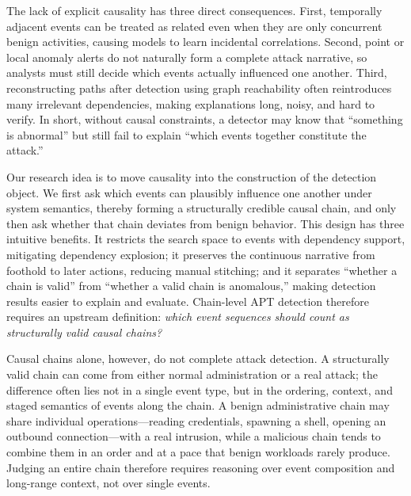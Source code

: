 The lack of explicit causality has three direct consequences. First, temporally adjacent events can be treated as related even when they are only concurrent benign activities, causing models to learn incidental correlations. Second, point or local anomaly alerts do not naturally form a complete attack narrative, so analysts must still decide which events actually influenced one another. Third, reconstructing paths after detection using graph reachability often reintroduces many irrelevant dependencies, making explanations long, noisy, and hard to verify. In short, without causal constraints, a detector may know that ``something is abnormal'' but still fail to explain ``which events together constitute the attack.''

Our research idea is to move causality into the construction of the detection object. We first ask which events can plausibly influence one another under system semantics, thereby forming a structurally credible causal chain, and only then ask whether that chain deviates from benign behavior. This design has three intuitive benefits. It restricts the search space to events with dependency support, mitigating dependency explosion; it preserves the continuous narrative from foothold to later actions, reducing manual stitching; and it separates ``whether a chain is valid'' from ``whether a valid chain is anomalous,'' making detection results easier to explain and evaluate. Chain-level APT detection therefore requires an upstream definition: \emph{which event sequences should count as structurally valid causal chains?}

Causal chains alone, however, do not complete attack detection. A structurally valid chain can come from either normal administration or a real attack; the difference often lies not in a single event type, but in the ordering, context, and staged semantics of events along the chain. A benign administrative chain may share individual operations---reading credentials, spawning a shell, opening an outbound connection---with a real intrusion, while a malicious chain tends to combine them in an order and at a pace that benign workloads rarely produce. Judging an entire chain therefore requires reasoning over event composition and long-range context, not over single events.

